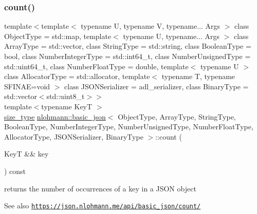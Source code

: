 \subsubsection{\texorpdfstring{count()}{count()}}
{\footnotesize\ttfamily template$<$template$<$ typename U, typename V, typename... Args $>$ class Object\+Type = std\+::map, template$<$ typename U, typename... Args $>$ class Array\+Type = std\+::vector, class String\+Type  = std\+::string, class Boolean\+Type  = bool, class Number\+Integer\+Type  = std\+::int64\+\_\+t, class Number\+Unsigned\+Type  = std\+::uint64\+\_\+t, class Number\+Float\+Type  = double, template$<$ typename U $>$ class Allocator\+Type = std\+::allocator, template$<$ typename T, typename S\+F\+I\+N\+A\+E=void $>$ class J\+S\+O\+N\+Serializer = adl\+\_\+serializer, class Binary\+Type  = std\+::vector$<$std\+::uint8\+\_\+t$>$$>$ \\
template$<$typename KeyT $>$ \\
\hyperlink{classnlohmann_1_1basic__json_a3ada29bca70b4965f6fd37ec1c8f85f7}{size\+\_\+type} \hyperlink{classnlohmann_1_1basic__json}{nlohmann\+::basic\+\_\+json}$<$ Object\+Type, Array\+Type, String\+Type, Boolean\+Type, Number\+Integer\+Type, Number\+Unsigned\+Type, Number\+Float\+Type, Allocator\+Type, J\+S\+O\+N\+Serializer, Binary\+Type $>$\+::count (\begin{DoxyParamCaption}\item[{KeyT \&\&}]{key }\end{DoxyParamCaption}) const\hspace{0.3cm}{\ttfamily [inline]}}



returns the number of occurrences of a key in a J\+S\+ON object 

\begin{DoxySeeAlso}{See also}
\href{https://json.nlohmann.me/api/basic_json/count/}{\tt https\+://json.\+nlohmann.\+me/api/basic\+\_\+json/count/} 
\end{DoxySeeAlso}
\mbox{\label{classnlohmann_1_1basic__json_a044298d189bdf7e4b36492de9811ddd6}} 
